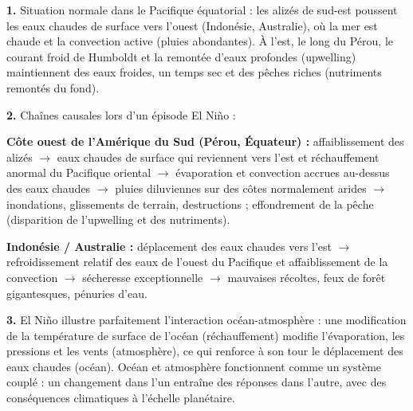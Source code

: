 \documentclass[11pt]{article}
\begin{document}
\begin{corrige}
\textbf{1.} Situation normale dans le Pacifique équatorial : les alizés de sud-est poussent les eaux chaudes de surface vers l'ouest (Indonésie, Australie), où la mer est chaude et la convection active (pluies abondantes). À l'est, le long du Pérou, le courant froid de Humboldt et la remontée d'eaux profondes (upwelling) maintiennent des eaux froides, un temps sec et des pêches riches (nutriments remontés du fond).

\textbf{2.} Chaînes causales lors d'un épisode El Niño :

\textbf{Côte ouest de l'Amérique du Sud (Pérou, Équateur) :} affaiblissement des alizés $\rightarrow$ eaux chaudes de surface qui reviennent vers l'est et réchauffement anormal du Pacifique oriental $\rightarrow$ évaporation et convection accrues au-dessus des eaux chaudes $\rightarrow$ pluies diluviennes sur des côtes normalement arides $\rightarrow$ inondations, glissements de terrain, destructions ; effondrement de la pêche (disparition de l'upwelling et des nutriments).

\textbf{Indonésie / Australie :} déplacement des eaux chaudes vers l'est $\rightarrow$ refroidissement relatif des eaux de l'ouest du Pacifique et affaiblissement de la convection $\rightarrow$ sécheresse exceptionnelle $\rightarrow$ mauvaises récoltes, feux de forêt gigantesques, pénuries d'eau.

\textbf{3.} El Niño illustre parfaitement l'interaction océan-atmosphère : une modification de la température de surface de l'océan (réchauffement) modifie l'évaporation, les pressions et les vents (atmosphère), ce qui renforce à son tour le déplacement des eaux chaudes (océan). Océan et atmosphère fonctionnent comme un système couplé : un changement dans l'un entraîne des réponses dans l'autre, avec des conséquences climatiques à l'échelle planétaire.
\end{corrige}
\end{document}
